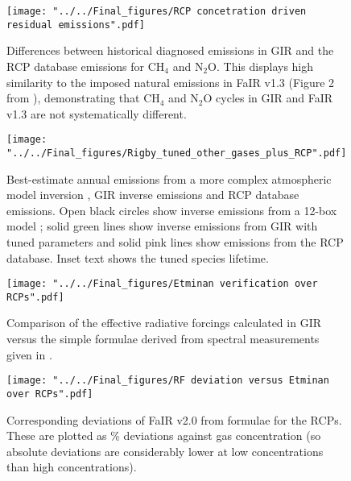 \documentclass[gmd, manuscript]{copernicus}
\begin{document}
\begin{figure}[t]
    \texttt{[image: "../../Final\_figures/RCP concetration driven residual emissions".pdf]}
    \caption{Differences between historical diagnosed emissions in GIR and the RCP database emissions for CH$_4$ and N$_2$O. This displays high similarity to the imposed natural emissions in FaIR v1.3 (Figure 2 from \cite{Smith2017}), demonstrating that CH$_4$ and N$_2$O cycles in GIR and FaIR v1.3 are not systematically different.}
\end{figure}

\begin{figure}[t]
    \texttt{[image: "../../Final\_figures/Rigby\_tuned\_other\_gases\_plus\_RCP".pdf]}
    \caption{Best-estimate annual emissions from a more complex atmospheric model inversion \cite{Rigby2014}, GIR inverse emissions and RCP database emissions. Open black circles show inverse emissions from a 12-box model \cite{Cunnold1994}; solid green lines show inverse emissions from GIR with tuned parameters and solid pink lines show emissions from the RCP database. Inset text shows the tuned species lifetime.}
\end{figure}

\begin{figure}[t]
    \texttt{[image: "../../Final\_figures/Etminan verification over RCPs".pdf]}
    \caption{Comparison of the effective radiative forcings calculated in GIR versus the simple formulae derived from spectral measurements given in \cite{Etminan2016}.}
\end{figure}

\begin{figure}[t]
    \texttt{[image: "../../Final\_figures/RF deviation versus Etminan over RCPs".pdf]}
    \caption{Corresponding deviations of FaIR v2.0 from \cite{Etminan2016} formulae for the RCPs. These are plotted as \% deviations against gas concentration (so absolute deviations are considerably lower at low concentrations than high concentrations).}
\end{figure}
\end{document}
